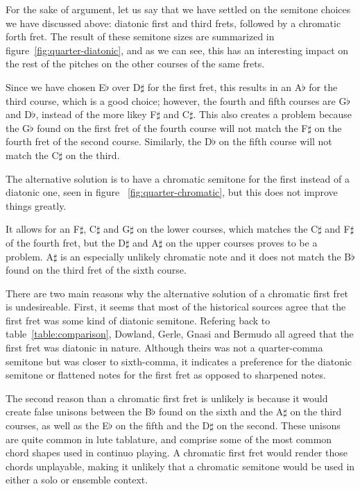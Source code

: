 For the sake of argument, let us say that we have settled on the semitone choices we have
discussed above: diatonic first and third frets, followed by a chromatic forth fret.  The
result of these semitone sizes are summarized in figure~\ref{fig:quarter-diatonic}, and as
we can see, this has an interesting impact on the rest of the pitches on the other courses
of the same frets.

Since we have chosen E$\flat$ over D$\sharp$ for the first fret, this
results in an A$\flat$ for the third course, which is a good choice; however, the fourth
and fifth courses are G$\flat$ and D$\flat$, instead of the more likey F$\sharp$ and
C$\sharp$. This also creates a problem because the G$\flat$ found on the first fret of the
fourth course will not match the F$\sharp$ on the fourth fret of the second course.
Similarly, the D$\flat$ on the fifth course will not match the C$\sharp$ on the third.

The alternative solution is to have a chromatic semitone for the first instead of a
diatonic one, seen in figure ~\ref{fig:quarter-chromatic}, but this does not improve
things greatly.

It allows for an F$\sharp$, C$\sharp$ and G$\sharp$ on the lower courses,
which matches the C$\sharp$ and F$\sharp$ of the fourth fret, but the D$\sharp$ and
A$\sharp$ on the upper courses proves to be a problem. A$\sharp$ is an especially unlikely
chromatic note and it does not match the B$\flat$ found on the third fret of the sixth
course.

There are two main reasons why the alternative solution of a chromatic first fret is
undesireable. First, it seems that most of the historical sources agree that the first
fret was some kind of diatonic semitone.  Refering back to table~\ref{table:comparison},
Dowland, Gerle, Gnasi and Bermudo all agreed that the first fret was diatonic in nature.
Although theirs was not a quarter-comma semitone but was closer to sixth-comma, it
indicates a preference for the diatonic semitone or flattened notes for the first fret as
opposed to sharpened notes.

The second reason than a chromatic first fret is unlikely is because it would create false
unisons between the B$\flat$ found on the sixth and the A$\sharp$ on the third courses, as
well as the E$\flat$ on the fifth and the D$\sharp$ on the second. These unisons are quite
common in lute tablature, and comprise some of the most common chord shapes used in
continuo playing.  A chromatic first fret would render those chords unplayable, making it
unlikely that a chromatic semitone would be used in either a solo or ensemble context.

